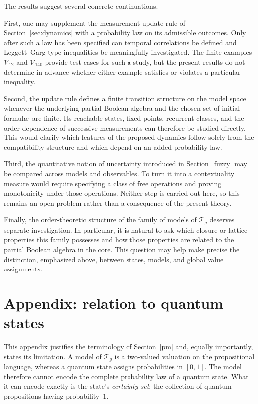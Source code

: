 \documentclass{article}   	%
\theoremstyle{plain}
\theoremstyle{definition}
\theoremstyle{remark}
\begin{document}
The results suggest several concrete continuations.

First, one may supplement the measurement-update rule of
Section~\ref{sec:dynamics} with a probability law on its admissible outcomes.
Only after such a law has been specified can temporal correlations be defined
and Leggett--Garg-type inequalities be meaningfully investigated.  The finite
examples $\mathcal V_{12}$ and $\mathcal V_{140}$ provide test cases for such a
study, but the present results do not determine in advance whether either
example satisfies or violates a particular inequality.

Second, the update rule defines a finite transition structure on the model
space whenever the underlying partial Boolean algebra and the chosen set of
initial formul\ae\ are finite.  Its reachable states, fixed points, recurrent
classes, and the order dependence of successive measurements can therefore be
studied directly.  This would clarify which features of the proposed dynamics
follow solely from the compatibility structure and which depend on an added
probability law.

Third, the quantitative notion of uncertainty introduced in
Section~\ref{fuzzy} may be compared across models and observables.  To turn it
into a contextuality measure would require specifying a class of free
operations and proving monotonicity under those operations.  Neither step is
carried out here, so this remains an open problem rather than a consequence of
the present theory.

Finally, the order-theoretic structure of the family of models of
$\mathcal T_g$ deserves separate investigation.  In particular, it is natural
to ask which closure or lattice properties this family possesses and how those
properties are related to the partial Boolean algebra in the core.  This
question may help make precise the distinction, emphasized above, between
states, models, and global value assignments.

\appendix
\section{Appendix: relation to quantum states}
\label{App:QT}

This appendix justifies the terminology of Section~\ref{pm} and, equally
importantly, states its limitation.
A model of $\mathcal T_g$ is a two-valued valuation on the propositional
language, whereas a quantum state assigns probabilities in $[0,1]$.
The model therefore cannot encode the complete probability law of a quantum
state.
What it can encode exactly is the state's \emph{certainty set}: the collection
of quantum propositions having probability~$1$.
\end{document}
